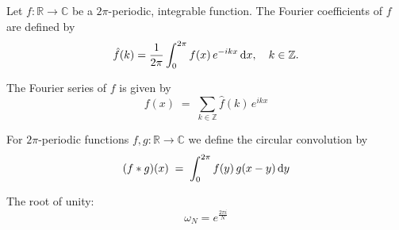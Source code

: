 Let $f:\mathbb{R} \to \mathbb{C}$ be a $2\pi$-periodic, integrable function.
The Fourier coefficients of $f$ are defined by
\[
	\hat f(k)
	=
	\frac{1}{2\pi}\int_0^{2\pi} f(x)\,e^{-ikx} \, \mathrm{d}x,
	\quad k \in \mathbb{Z}.
\]

The Fourier series of $f$ is given by
\[
	f(x)
	\;=\;
	\sum_{k\in\mathbb{Z}} \hat f(k)\,e^{ikx}
\]

For $2\pi$-periodic functions $f,g \colon \mathbb{R}\to\mathbb{C}$ we define the
circular convolution by
\begin{equation}
	(f \ast g)(x)
	\;=\;
	\int_0^{2\pi} f(y)\,g(x-y) \, \mathrm{d}y
	\label{eq:convolution}
\end{equation}

The root of unity:
\[\omega_N = e^{\frac{2\pi i}{N}}\]